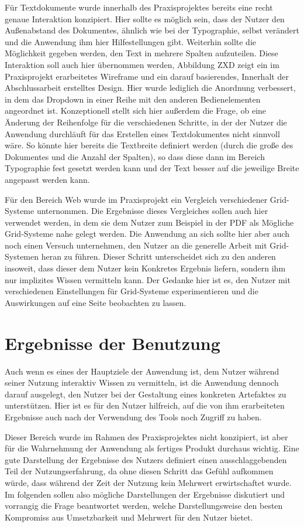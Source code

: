 Für Textdokumente wurde innerhalb des Praxisprojektes bereits eine recht genaue Interaktion konzipiert. Hier sollte es möglich sein, dass der Nutzer den Außenabstand des Dokumentes, ähnlich wie bei der Typographie, selbst verändert und die Anwendung ihm hier Hilfestellungen gibt. Weiterhin sollte die Möglichkeit gegeben werden, den Text in mehrere Spalten aufzuteilen. Diese Interaktion soll auch hier übernommen werden, Abbildung ZXD zeigt ein im Praxisprojekt erarbeitetes Wireframe und ein darauf basierendes, Innerhalt der Abschlussarbeit erstelltes Design.
Hier wurde lediglich die Anordnung verbessert, in dem das Dropdown in einer Reihe mit den anderen Bedienelementen angeordnet ist.
Konzeptionell stellt sich hier außerdem die Frage, ob eine Änderung der Reihenfolge für die verschiedenen Schritte, in der der Nutzer die Anwendung durchläuft für das Erstellen eines Textdokumentes nicht sinnvoll wäre. So könnte hier bereits die Textbreite definiert werden (durch die große des Dokumentes und die Anzahl der Spalten), so dass diese dann im Bereich Typographie fest gesetzt werden kann und der Text besser auf die jeweilige Breite angepasst werden kann.

Für den Bereich Web wurde im Praxisprojekt ein Vergleich verschiedener Grid-Systeme unternommen. Die Ergebnisse dieses Vergleiches sollen auch hier verwendet werden, in dem sie dem Nutzer zum Beispiel in der PDF als Mögliche Grid-Systeme nahe gelegt werden.
Die Anwendung an sich sollte hier aber auch noch einen Versuch unternehmen, den Nutzer an die generelle Arbeit mit Grid-Systemen heran zu führen. Dieser Schritt unterscheidet sich zu den anderen insoweit, dass dieser dem Nutzer kein Konkretes Ergebnis liefern, sondern ihm nur implizites Wissen vermitteln kann.
Der Gedanke hier ist es, den Nutzer mit verschiedenen Einstellungen für Grid-Systeme experimentieren und die Auswirkungen auf eine Seite beobachten zu lassen.

\section{Ergebnisse der Benutzung}
Auch wenn es eines der Hauptziele der Anwendung ist, dem Nutzer während seiner Nutzung interaktiv Wissen zu vermitteln, ist die Anwendung dennoch darauf ausgelegt, den Nutzer bei der Gestaltung eines konkreten Artefaktes zu unterstützen. Hier ist es für den Nutzer hilfreich, auf die von ihm erarbeiteten Ergebnisse auch nach der Verwendung des Tools noch Zugriff zu haben.

Dieser Bereich wurde im Rahmen des Praxisprojektes nicht konzipiert, ist aber für die Wahrnehmung der Anwendung als fertiges Produkt durchaus wichtig. Eine gute Darstellung der Ergebnisse des Nutzers definiert einen ausschlaggebenden Teil der Nutzungserfahrung, da ohne diesen Schritt das Gefühl aufkommen würde, dass während der Zeit der Nutzung kein Mehrwert erwirtschaftet wurde.
Im folgenden sollen also mögliche Darstellungen der Ergebnisse diskutiert und vorrangig die Frage beantwortet werden, welche Darstellungsweise den besten Kompromiss aus Umsetzbarkeit und Mehrwert für den Nutzer bietet.

